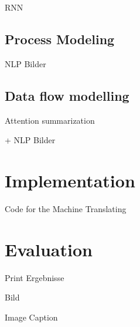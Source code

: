 RNN

\subsection{Process Modeling}

NLP Bilder

\subsection{Data flow modelling}

Attention summarization 

+ NLP Bilder

\section{Implementation}

Code for the Machine Translating

\section{Evaluation}

Print Ergebnisse

Bild

Image Caption